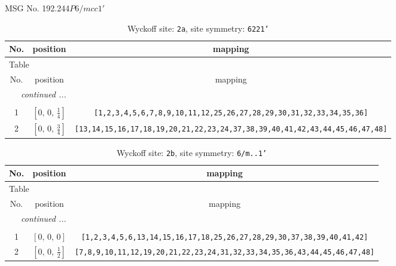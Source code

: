 \documentclass[fleqn,8pt]{jsarticle}
\begin{document}
\setcounter{MaxMatrixCols}{32}

\renewcommand{\tablename}{Table~}
\renewcommand{\figurename}{Figure~}
\begin{center}
\LARGE
MSG No. 192.244\quad$P6/mcc1'$
\end{center}
\renewcommand{\arraystretch}{1.2}
\begin{longtable}{ccc}
\caption{Wyckoff site: {\tt 2a}, site symmetry: {\tt 6221'}}
 \\
 \hline \hline
No. & position & mapping \\ \hline \endfirsthead

\multicolumn{2}{l}{\tablename\ \thetable{}} \\
 \hline \hline
No. & position & mapping \\ \hline \endhead

 \hline \hline
\multicolumn{2}{r}{\footnotesize\it continued ...} \\ \endfoot

 \hline \hline
\multicolumn{2}{r}{} \\ \endlastfoot

1 & $\left[ 0,\, 0,\, \frac{1}{4} \right]$ & {\tt [1,2,3,4,5,6,7,8,9,10,11,12,25,26,27,28,29,30,31,32,33,34,35,36]} \\ \hline
2 & $\left[ 0,\, 0,\, \frac{3}{4} \right]$ & {\tt [13,14,15,16,17,18,19,20,21,22,23,24,37,38,39,40,41,42,43,44,45,46,47,48]} \\
\end{longtable}
\renewcommand{\arraystretch}{1.2}
\begin{longtable}{ccc}
\caption{Wyckoff site: {\tt 2b}, site symmetry: {\tt 6/m..1'}}
 \\
 \hline \hline
No. & position & mapping \\ \hline \endfirsthead

\multicolumn{2}{l}{\tablename\ \thetable{}} \\
 \hline \hline
No. & position & mapping \\ \hline \endhead

 \hline \hline
\multicolumn{2}{r}{\footnotesize\it continued ...} \\ \endfoot

 \hline \hline
\multicolumn{2}{r}{} \\ \endlastfoot

1 & $\left[ 0,\, 0,\, 0 \right]$ & {\tt [1,2,3,4,5,6,13,14,15,16,17,18,25,26,27,28,29,30,37,38,39,40,41,42]} \\ \hline
2 & $\left[ 0,\, 0,\, \frac{1}{2} \right]$ & {\tt [7,8,9,10,11,12,19,20,21,22,23,24,31,32,33,34,35,36,43,44,45,46,47,48]} \\
\end{longtable}
\end{document}

